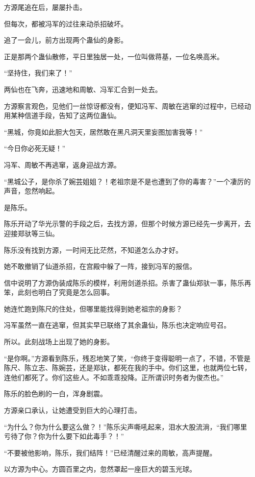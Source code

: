 \begin{this_body}
方源尾追在后，屡屡扑击。

但每次，都被冯军的过往来动杀招破坏。

追了一会儿，前方出现两个蛊仙的身影。

正是那两个蛊仙散修，平日里独居一处，一位叫做蒋基，一位名唤高米。

“坚持住，我们来了！”

两仙也在飞奔，迅速地和周敏、冯军汇合到一处去。

方源察言观色，见他们一丝惊讶都没有，便知冯军、周敏在逃窜的过程中，已经动用某种信道手段，告知了这两位蛊仙。

“黑城，你竟如此胆大包天，居然敢在黑凡洞天里妄图加害我等！”

“今日你必死无疑！”

冯军、周敏不再逃窜，返身迎战方源。

“黑城公子，是你杀了婉芸姐姐？！老祖宗是不是也遭到了你的毒害？”一个凄厉的声音，忽然响起。

是陈乐。

陈乐开动了华光示警的手段之后，去找方源，但那个时候方源已经先一步离开，去迎接郑驮等三仙。

陈乐没有找到方源，一时间无比茫然，不知道怎么办才好。

她不敢撤销了仙道杀招，在宫殿中躲了一阵，接到冯军的报信。

信中说明了方源伪装成陈乐的模样，利用剑道杀招。杀害了蛊仙郑驮一事，陈乐再笨，此刻也明白了究竟是怎么回事。

她连忙跑到陈尺的住处，但哪里能找得到她老祖宗的身影？

冯军虽然一直在逃窜，但其实早已联络了其余蛊仙，陈乐也决定响应号召。

所以。此刻战场上出现了她的身影。

“是你啊。”方源看到陈乐，残忍地笑了笑，“你终于变得聪明一点了，不错，不管是陈尺、陈立志、陈婉芸，还是郑驮，都死在我的手中。你们这里，也就两位七转，连他们都死了。你们这些人。不如乖乖投降。正所谓识时务者为俊杰也。”

陈乐的脸色刷的一白，浑身剧震。

方源亲口承认，让她遭受到巨大的心理打击。

“为什么？你为什么要这么做？！”陈乐尖声嘶吼起来，泪水大股流淌，“我们哪里亏待了你？你为什么要下如此毒手？！”

“不要被他影响，陈乐，我们结阵！”已经清醒过来的周敏，高声提醒。

以方源为中心。方圆百里之内，忽然罩起一座巨大的碧玉光球。


\end{this_body}
